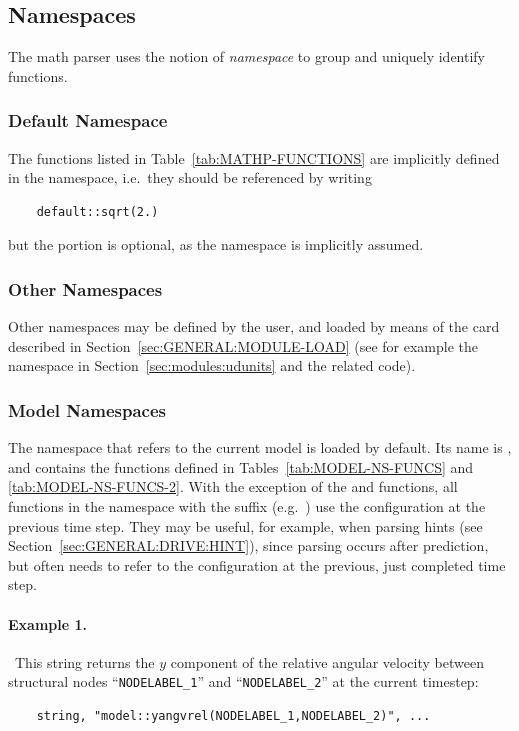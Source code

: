 \subsection{Namespaces}
\label{sec:GENERAL:NAMESPACE}
The math parser uses the notion of \emph{namespace} to group and uniquely identify functions.

\subsubsection{Default Namespace}
The functions listed in Table~\ref{tab:MATHP-FUNCTIONS}
are implicitly defined in the  namespace, 
i.e.\ they should be referenced by writing
\begin{verbatim}
    default::sqrt(2.)
\end{verbatim}
but the  portion is optional, as the  namespace is implicitly assumed.

\subsubsection{Other Namespaces}
Other namespaces may be defined by the user, and loaded by means
of the  card described
in Section~\ref{sec:GENERAL:MODULE-LOAD}
(see for example the  namespace in Section~\ref{sec:modules:udunits} and the related code).

\subsubsection{Model Namespaces}
The namespace that refers to the current model is loaded by default.
Its name is , and contains the functions 
defined in Tables~\ref{tab:MODEL-NS-FUNCS} and \ref{tab:MODEL-NS-FUNCS-2}.
With the exception of the  and  functions,
all functions in the  namespace
with the suffix  (e.g.\ )
use the configuration at the previous time step.
They may be useful, for example, when parsing hints
(see Section~\ref{sec:GENERAL:DRIVE:HINT}),
since  parsing occurs after prediction,
but often needs to refer to the configuration
at the previous, just completed time step.

\paragraph{Example 1.} \
This string returns the $y$ component of the relative angular velocity between structural nodes ``\verb;NODELABEL_1;'' and ``\verb;NODELABEL_2;'' at the current timestep:
\begin{verbatim}
    string, "model::yangvrel(NODELABEL_1,NODELABEL_2)", ...
\end{verbatim}

